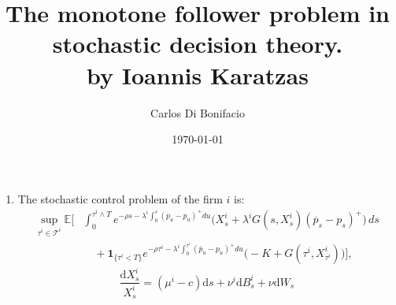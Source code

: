 \documentclass[aspectratio=169,xcolor=dvipsnames]{beamer}
\title{\large The monotone follower problem in stochastic decision theory.
 \\ \small by Ioannis Karatzas}
\subtitle{}
\author{Carlos Di Bonifacio}
\institute
{
   ENSAE %
}
\date{\today} %
\begin{document}
\begin{frame}
    \titlepage
\end{frame}



\begin{frame}[]
    \begin{enumerate}
        \item The stochastic control problem of the firm $i$ is:
        \begin{align*}
    \sup_{\tau^i \in \mathcal{T}^i} \mathbb{E} \Bigg[ &\int_0^{\tau^i \wedge T} e^{- \rho s - \lambda^i \int_0^s (\overline{p}_u-p_u)^+du} \Big(X_s^i + \lambda^i G(s,X_s^i)(\overline{p}_s - p_s)^+\Big) \,ds \\
    & \quad + \mathbf{1}_{ \{ \tau^i < T \} } e^{-\rho \tau^i - \lambda^i \int_0^{\tau^i} (\overline{p}_u-p_u)^+du} \Big(-K + G(\tau^i,X_{\tau^i}^i)\Big) \Bigg],
     \end{align*}
     \begin{equation*}
    \frac{ \mathrm{d} X_s^i}{ X_s^i} = (\mu^i - c)\mathrm{d}s + \nu^i \mathrm{d} B_s^i + \nu \mathrm{d}W_s
    \end{equation*}
    \end{enumerate}
\end{frame}









\end{document}
